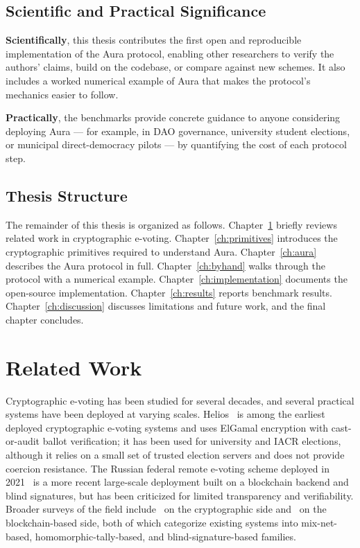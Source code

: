\documentclass[12pt,a4paper,oneside]{report}
\begin{document}
\section*{Scientific and Practical Significance}
\textbf{Scientifically}, this thesis contributes the first open and 
reproducible implementation of the Aura protocol, enabling other researchers 
to verify the authors' claims, build on the codebase, or compare against 
new schemes. It also includes a worked numerical example of Aura that 
makes the protocol's mechanics easier to follow.

\textbf{Practically}, the benchmarks provide concrete guidance to anyone 
considering deploying Aura --- for example, in DAO governance, university 
student elections, or municipal direct-democracy pilots --- by quantifying 
the cost of each protocol step.

\section*{Thesis Structure}
The remainder of this thesis is organized as follows. 
Chapter~\ref{ch:literature} briefly reviews related work in cryptographic 
e-voting. Chapter~\ref{ch:primitives} introduces the cryptographic 
primitives required to understand Aura. Chapter~\ref{ch:aura} describes 
the Aura protocol in full. Chapter~\ref{ch:byhand} walks through the 
protocol with a numerical example. Chapter~\ref{ch:implementation} 
documents the open-source implementation. Chapter~\ref{ch:results} 
reports benchmark results. Chapter~\ref{ch:discussion} discusses 
limitations and future work, and the final chapter concludes.

\chapter{Related Work}
\label{ch:literature}

Cryptographic e-voting has been studied for several decades, and several 
practical systems have been deployed at varying scales. Helios~\cite{helios} 
is among the earliest deployed cryptographic e-voting systems and uses 
ElGamal encryption with cast-or-audit ballot verification; it has been 
used for university and IACR elections, although it relies on a small 
set of trusted election servers and does not provide coercion resistance. 
The Russian federal remote e-voting scheme deployed in 2021~\cite{russian2021} 
is a more recent large-scale deployment built on a blockchain backend and 
blind signatures, but has been criticized for limited transparency and 
verifiability. Broader surveys of the field 
include~\cite{cryptoreview} on the cryptographic side and~\cite{blockchainreview} 
on the blockchain-based side, both of which categorize existing systems 
into mix-net-based, homomorphic-tally-based, and blind-signature-based 
families.
\end{document}
